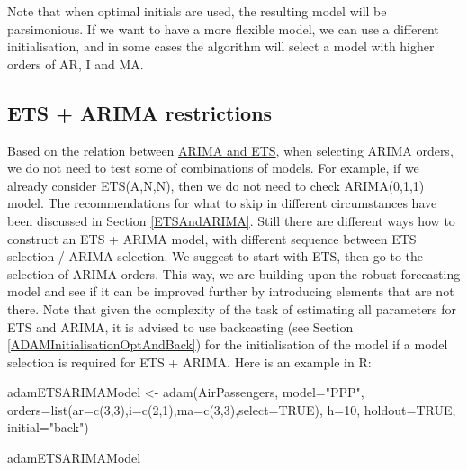 \documentclass[
]{book}
\newenvironment{Shaded}{\begin{snugshade}}{\end{snugshade}}
\newcommand{\AttributeTok}[1]{\textcolor[rgb]{0.77,0.63,0.00}{#1}}
\newcommand{\ConstantTok}[1]{\textcolor[rgb]{0.00,0.00,0.00}{#1}}
\newcommand{\DecValTok}[1]{\textcolor[rgb]{0.00,0.00,0.81}{#1}}
\newcommand{\FunctionTok}[1]{\textcolor[rgb]{0.00,0.00,0.00}{#1}}
\newcommand{\NormalTok}[1]{#1}
\newcommand{\OtherTok}[1]{\textcolor[rgb]{0.56,0.35,0.01}{#1}}
\newcommand{\StringTok}[1]{\textcolor[rgb]{0.31,0.60,0.02}{#1}}
\theoremstyle{definition}
\theoremstyle{definition}
\theoremstyle{definition}
\theoremstyle{definition}
\theoremstyle{remark}
\begin{document}
Note that when optimal initials are used, the resulting model will be parsimonious. If we want to have a more flexible model, we can use a different initialisation, and in some cases the algorithm will select a model with higher orders of AR, I and MA.

\hypertarget{ets-arima-restrictions}{%
\subsection{ETS + ARIMA restrictions}\label{ets-arima-restrictions}}

Based on the relation between \protect\hyperlink{ARIMAandETS}{ARIMA and ETS}, when selecting ARIMA orders, we do not need to test some of combinations of models. For example, if we already consider ETS(A,N,N), then we do not need to check ARIMA(0,1,1) model. The recommendations for what to skip in different circumstances have been discussed in Section \ref{ETSAndARIMA}. Still there are different ways how to construct an ETS + ARIMA model, with different sequence between ETS selection / ARIMA selection. We suggest to start with ETS, then go to the selection of ARIMA orders. This way, we are building upon the robust forecasting model and see if it can be improved further by introducing elements that are not there. Note that given the complexity of the task of estimating all parameters for ETS and ARIMA, it is advised to use backcasting (see Section \ref{ADAMInitialisationOptAndBack}) for the initialisation of the model if a model selection is required for ETS + ARIMA. Here is an example in R:

\begin{Shaded}
\begin{Highlighting}[]
\NormalTok{adamETSARIMAModel }\OtherTok{\textless{}{-}}
    \FunctionTok{adam}\NormalTok{(AirPassengers, }\AttributeTok{model=}\StringTok{"PPP"}\NormalTok{,}
         \AttributeTok{orders=}\FunctionTok{list}\NormalTok{(}\AttributeTok{ar=}\FunctionTok{c}\NormalTok{(}\DecValTok{3}\NormalTok{,}\DecValTok{3}\NormalTok{),}\AttributeTok{i=}\FunctionTok{c}\NormalTok{(}\DecValTok{2}\NormalTok{,}\DecValTok{1}\NormalTok{),}\AttributeTok{ma=}\FunctionTok{c}\NormalTok{(}\DecValTok{3}\NormalTok{,}\DecValTok{3}\NormalTok{),}\AttributeTok{select=}\ConstantTok{TRUE}\NormalTok{),}
         \AttributeTok{h=}\DecValTok{10}\NormalTok{, }\AttributeTok{holdout=}\ConstantTok{TRUE}\NormalTok{, }\AttributeTok{initial=}\StringTok{"back"}\NormalTok{)}

\NormalTok{adamETSARIMAModel}
\end{Highlighting}
\end{Shaded}
\end{document}
